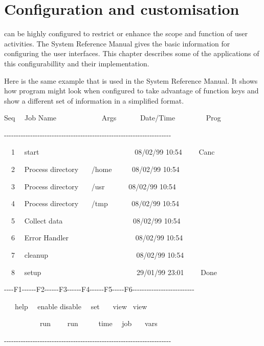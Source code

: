 \chapter{Configuration and customisation}
\label{chp:configurability}
\ProductName{} can be highly configured to restrict or enhance the scope and
function of user activities. The System Reference Manual
gives the basic information for configuring the user interfaces. This
chapter describes some of the applications of this configurabillity and
their implementation.

Here is the same example that is used in the System Reference Manual. It
shows how program \PrBtq{} might look when configured
to take advantage of function keys and show a different set of
information in a simplified format.

\begin{expara}
Seq \ \ Job Name \ \ \ \ \ \ \ \ \ \ \ \ Args \ \ \ \ \ \ Date/Time
\ \ \ \ \ \ \ \ Prog

{}-{}-{}-{}-{}-{}-{}-{}-{}-{}-{}-{}-{}-{}-{}-{}-{}-{}-{}-{}-{}-{}-{}-{}-{}-{}-{}-{}-{}-{}-{}-{}-{}-{}-{}-{}-{}-{}-{}-{}-{}-{}-{}-{}-{}-{}-{}-{}-{}-{}-{}-{}-{}-{}-{}-{}-{}-{}-{}-{}-{}-{}-{}-{}-{}-{}-{}-{}-{}-{}-

\bigskip

\ \ 1 \ \ start
\ \ \ \ \ \ \ \ \ \ \ \ \ \ \ \ \ \ \ \ \ \ \ \ \ \ 08/02/99 10:54
\ \ \ \ Canc

\ \ 2 \ \ Process directory \ \ \ /home \ \ \ \ \ 08/02/99 10:54

\ \ 3 \ \ Process directory \ \ \ /usr \ \ \ \ \ \ 08/02/99 10:54

\ \ 4 \ \ Process directory \ \ \ /tmp \ \ \ \ \ \ 08/02/99 10:54

\ \ 5 \ \ Collect data \ \ \ \ \ \ \ \ \ \ \ \ \ \ \ \ \ \ \ 08/02/99
10:54

\ \ 6 \ \ Error Handler \ \ \ \ \ \ \ \ \ \ \ \ \ \ \ \ \ \ 08/02/99
10:54

\ \ 7 \ \ cleanup
\ \ \ \ \ \ \ \ \ \ \ \ \ \ \ \ \ \ \ \ \ \ \ \ 08/02/99 10:54

\ \ 8 \ \ setup
\ \ \ \ \ \ \ \ \ \ \ \ \ \ \ \ \ \ \ \ \ \ \ \ \ \ 29/01/99 23:01
\ \ \ \ Done

\bigskip

{}-{}-{}-{}-F1-{}-{}-{}-{}-{}-F2-{}-{}-{}-{}-{}-F3-{}-{}-{}-{}-{}-F4-{}-{}-{}-{}-{}-F5-{}-{}-{}-{}-F6-{}-{}-{}-{}-{}-{}-{}-{}-{}-{}-{}-{}-{}-{}-{}-{}-{}-{}-{}-{}-{}-{}-{}-{}-{}-

\ \ \ help \ \ enable disable \ \ set \ \ \ view \ view

\ \ \ \ \ \ \ \ \ \ run \ \ \ \ run \ \ \ \ \ time \ \ job \ \ \ vars

{}-{}-{}-{}-{}-{}-{}-{}-{}-{}-{}-{}-{}-{}-{}-{}-{}-{}-{}-{}-{}-{}-{}-{}-{}-{}-{}-{}-{}-{}-{}-{}-{}-{}-{}-{}-{}-{}-{}-{}-{}-{}-{}-{}-{}-{}-{}-{}-{}-{}-{}-{}-{}-{}-{}-{}-{}-{}-{}-{}-{}-{}-{}-{}-{}-{}-{}-{}-{}-{}-

\end{expara}

